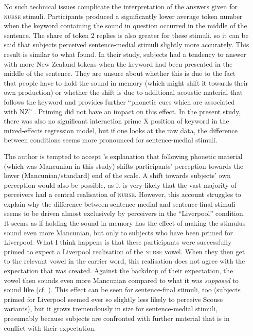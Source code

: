No such technical issues complicate the interpretation of the answers given for \textsc{nurse} stimuli.
Participants produced a significantly lower average token number when the keyword containing the sound in question occurred in the middle of the sentence.
The share of token 2 replies is also greater for these stimuli, so it can be said that subjects perceived sentence-medial stimuli slightly more accurately.
This result is similar to what \textcite{hayetal2006a} found.
In their study, subjects had a tendency to answer with more New Zealand tokens when the keyword had been presented in the middle of the sentence.
They are unsure about whether this is due to the fact that people have to hold the sound in memory (which might shift it towards their own production) or whether the shift is due to additional acoustic material that follows the keyword and provides further ``phonetic cues which are associated with NZ'' \parencite[365]{hayetal2006a}.
Priming did not have an impact on this effect.
In the present study, there was also no significant interaction prime X position of keyword in the mixed-effects regression model, but if one looks at the raw data, the difference between  conditions seems more pronounced for sentence-medial stimuli.

The author is tempted to accept \textcite{hayetal2006a}'s explanation that following phonetic material (which was Mancunian in this study) shifts participants' perception towards the lower (Mancunian/standard) end of the scale.
A shift towards subjects' own perception would also be possible, as it is very likely that the vast majority of perceivers had a central realisation of \textsc{nurse}.
However, this account struggles to explain why the difference between sentence-medial and sentence-final stimuli seems to be driven almost exclusively by perceivers in the ``Liverpool'' condition.
It seems as if holding the sound in memory has the effect of making the stimulus sound even more Mancunian, but only to subjects who have been primed for Liverpool.
What I think happens is that these participants were successfully primed to expect a Liverpool realisation of the \textsc{nurse} vowel.
When they then get to the relevant vowel in the carrier word, this realisation does not agree with the expectation that was created.
Against the backdrop of their expectation, the vowel then sounds even more Mancunian compared to what it was \emph{supposed} to sound like (cf. ).
This effect can be seen for sentence-final stimuli, too (subjects primed for Liverpool seemed ever so slightly less likely to perceive Scouse variants), but it grows tremendously in size for sentence-medial stimuli, presumably because subjects are confronted with further material that is in conflict with their expectation.

